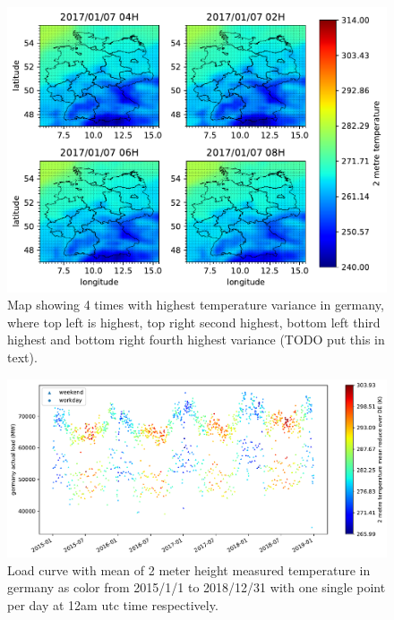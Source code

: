 \begin{figure}[h!]%
\centering
\includegraphics[width=\textwidth]{plots/t2m/bundles/maxvar4_maps}%
\caption{Map showing 4 times with highest temperature variance in germany, where top left is highest, top right second highest, bottom left third highest and bottom right fourth highest variance (TODO put this in text).}%
\label{fig:maxvar4_maps}%
\end{figure}

\begin{figure}[h!]%
\centering
\includegraphics[width=\textheight,angle=-90,origin=c]{plots/t2m_mean_2015010112_2018123112_24F}%
\caption{Load curve with mean of 2 meter height measured temperature in germany as color from 2015/1/1 to 2018/12/31 with one single point per day at 12am utc time respectively.}%
\label{fig:t2m_mean_2015010112_2018123112_24F}%
\end{figure}

